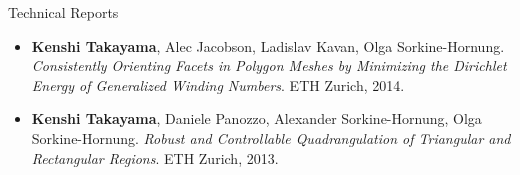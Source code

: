 {\Large\sc Technical Reports}
\vspace{-3mm}
\begin{itemize}
\item {\bf Kenshi Takayama}, Alec Jacobson, Ladislav Kavan, Olga Sorkine-Hornung. {\it Consistently Orienting Facets in Polygon Meshes by Minimizing the Dirichlet Energy of Generalized Winding Numbers}. ETH Zurich, 2014.
\item {\bf Kenshi Takayama}, Daniele Panozzo, Alexander Sorkine-Hornung, Olga Sorkine-Hornung. {\it Robust and Controllable Quadrangulation of Triangular and Rectangular Regions}. ETH Zurich, 2013.
\end{itemize}
